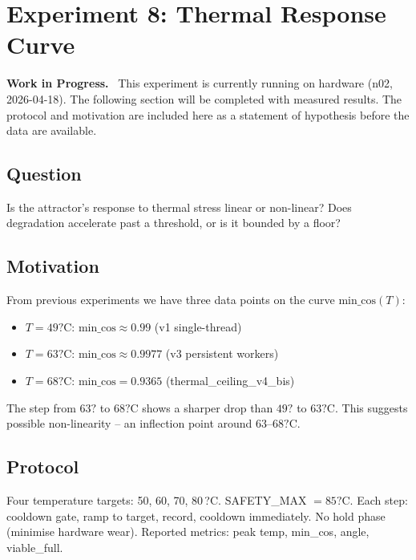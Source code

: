 \documentclass[11pt, a4paper]{article}
\newenvironment{wipnotice}{%
  \begin{mdframed}[backgroundcolor=yellow!10,linecolor=orange!70,linewidth=1pt]
  \small\textbf{Work in Progress.}\ }{%
  \end{mdframed}}
\begin{document}
\section{Experiment 8: Thermal Response Curve}
\label{sec:thermal_ladder}

\begin{wipnotice}
This experiment is currently running on hardware (n02, 2026-04-18).
The following section will be completed with measured results.
The protocol and motivation are included here as a statement of hypothesis
before the data are available.
\end{wipnotice}

\subsection*{Question} Is the attractor's response to thermal stress linear
or non-linear?
Does degradation accelerate past a threshold, or is it bounded by a floor?

\subsection{Motivation}

From previous experiments we have three data points on the curve
$\text{min\_cos}(T)$:
\begin{itemize}
  \item $T = 49?\mathrm{C}$: $\text{min\_cos} \approx 0.99$ (v1 single-thread)
  \item $T = 63?\mathrm{C}$: $\text{min\_cos} \approx 0.9977$ (v3 persistent workers)
  \item $T = 68?\mathrm{C}$: $\text{min\_cos} = 0.9365$ (thermal\_ceiling\_v4\_bis)
\end{itemize}

The step from $63?$ to $68?\mathrm{C}$ shows a sharper drop than
$49?$ to $63?\mathrm{C}$.
This suggests possible non-linearity -- an inflection point around $63$--$68?\mathrm{C}$.

\subsection{Protocol}

Four temperature targets: 50, 60, 70, 80\,?C.
SAFETY\_MAX $= 85?\mathrm{C}$.
Each step: cooldown gate, ramp to target, record, cooldown immediately.
No hold phase (minimise hardware wear).
Reported metrics: peak temp, min\_cos, angle, viable\_full.
\end{document}
